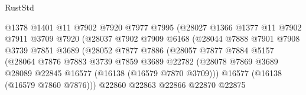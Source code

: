 \begin{lexlean}{RustStd}
\begin{coremodule}
                                  @1378
                                  @1401
                                  @11
                                  @7902
                                  @7920
                                  @7977
                                  @7995
                                  (@28027
                                    @1366
                                    @1377
                                    @11
                                    @7902
                                    @7911
                                    @3709
                                    @7920
                                    (@28037
                                      @7902
                                      @7909
                                      @6168
                                      (@28044
                                        @7888
                                        @7901
                                        @7908
                                        @3739
                                        @7851
                                        @3689
                                        (@28052
                                          @7877
                                          @7886
                                          (@28057
                                            @7877
                                            @7884
                                            @5157
                                            (@28064
                                              @7876
                                              @7883
                                              @3739
                                              @7859
                                              @3689
                                              @22782
                                              (@28078
                                                @7869
                                                @3689
                                                @28089
                                                @22845
                                                @16577
                                                (@16138 (@16579 @7870 @3709)))
                                              @16577
                                              (@16138 (@16579 @7860 @7876)))
                                            @22860
                                            @22863
                                            @22866
                                            @22870
                                            @22875

\end{coremodule}
\end{lexlean}
